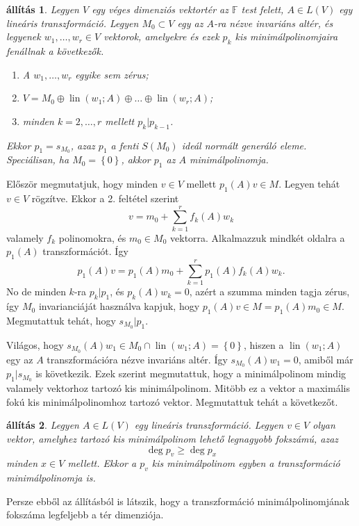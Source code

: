 \documentclass[9pt, a4paper, showtrims]{memoir}
\makeatletter
\renewenvironment{proof}[1][\proofname]
    {\par\pushQED{\qed}%
    \normalfont \topsep6\p@\@plus6\p@\relax
    \trivlist
    \item[\hskip\labelsep
        \itshape
    #1\@addpunct{:}]\ignorespaces}
    {\popQED\endtrivlist\@endpefalse}
\theoremstyle{plain}
\newtheorem{proposition}{állítás}[chapter]
\theoremstyle{remark}
\theoremstyle{definition}
\DeclareMathOperator{\lin}{lin}
\makeatother
\begin{document}
\begin{proposition}
    Legyen $V$ egy véges dimenziós vektortér az $\mathbb{F}$ test felett, $A\in L\left( V \right)$ egy lineáris transzformáció.
    Legyen $M_0\subset V$ egy az $A$-ra nézve invariáns altér, 
    és legyenek $w_1,\dots,w_r\in V$ vektorok, amelyekre és ezek $p_k$ kis minimálpolinomjaira
    fenállnak a következők.
    \begin{enumerate}
        \item A $w_1,\dots,w_r$ egyike sem zérus;
        \item $V=M_0\oplus\lin\left( w_1;A \right)\oplus\ldots\oplus\lin\left( w_r;A \right)$;
        \item minden $k=2,\dots,r$ mellett $p_k|p_{k-1}$.
    \end{enumerate}
    Ekkor $p_1=s_{M_0}$, azaz $p_1$ a fenti $S\left( M_0 \right)$ ideál normált generáló eleme.
    Speciálisan, ha $M_0=\left\{ 0 \right\}$, akkor $p_1$ az $A$ minimálpolinomja.
\end{proposition}
\begin{proof}
    Először megmutatjuk, hogy minden $v\in V$ mellett $p_1\left( A \right)v\in M$.
    Legyen tehát $v\in V$ rögzítve. 
    Ekkor a 2. feltétel szerint
    \[
        v=m_0+\sum_{k=1}^rf_k\left( A \right)w_k
    \]
    valamely $f_k$ polinomokra, és $m_0\in M_0$ vektorra.
    Alkalmazzuk mindkét oldalra a $p_1\left( A \right)$ transzformációt.
    Így
    \[
        p_1\left( A \right)v=p_1\left( A \right)m_0+\sum_{k=1}^rp_1\left( A \right)f_k\left( A \right)w_k.
    \]
    No de minden $k$-ra $p_k|p_1$, és $p_k\left( A \right)w_k=0$, azért a szumma minden tagja zérus,
    így $M_0$ invarianciáját használva kapjuk, hogy $p_1\left( A \right)v\in M=p_1\left( A \right)m_0\in M.$
    Megmutattuk tehát, hogy $s_{M_0}|p_1$.

    Világos, hogy $s_{M_0}\left( A \right)w_1\in M_0\cap\lin\left( w_1;A \right)=\left\{ 0 \right\}$,
    hiszen a $\lin\left( w_1;A \right)$ egy az $A$ transzformációra nézve invariáns altér.
    Így $s_{M_0}\left( A \right)w_1=0$, amiből már $p_1|s_{M_0}$ is következik.
\end{proof}
Ezek szerint megmutattuk, hogy a minimálpolinom mindig valamely vektorhoz tartozó kis minimálpolinom.
Mitöbb ez a vektor a maximális fokú kis minimálpolinomhoz tartozó vektor.
Megmutattuk tehát a következőt.
\begin{proposition}
    Legyen $A\in L\left( V \right)$ egy lineáris transzformáció. 
    Legyen $v\in V$ olyan vektor, amelyhez tartozó kis minimálpolinom lehető legnagyobb fokszámú,
    azaz
    \[
        \deg p_v\geq \deg p_x
    \]
    minden $x\in V$ mellett.
    Ekkor a $p_v$ kis minimálpolinom egyben a transzformáció minimálpolinomja is.
\end{proposition}
Persze ebből az állításból is látszik, hogy a transzformáció minimálpolinomjának fokszáma legfeljebb  a tér dimenziója.
\end{document}

